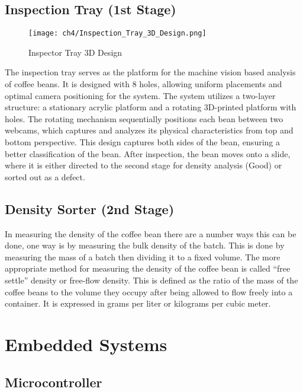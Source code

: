 \subsection{Inspection Tray (1st Stage)}

\begin{figure}[h]
    \centering
    \texttt{[image: ch4/Inspection\_Tray\_3D\_Design.png]} %
    \caption{Inspector Tray 3D Design}
    \label{fig:inspection_tray}
\end{figure}

The inspection tray serves as the platform for the machine vision based analysis of coffee beans. It is designed with 8 holes, allowing uniform placements and optimal camera positioning for the system. The system utilizes a two-layer structure: a stationary acrylic platform and a rotating 3D-printed platform with holes. The rotating mechanism sequentially positions each bean between two webcams, which captures and analyzes its physical characteristics from top and bottom perspective. This design captures both sides of the bean, ensuring a better classification of the bean. After inspection, the bean moves onto a slide, where it is either directed to the second stage for density analysis (Good) or sorted out as a defect.

\subsection{Density Sorter (2nd Stage)}

In measuring the density of the coffee bean there are a number ways this can be done, one way is by measuring the bulk density of the batch. This is done by measuring the mass of a batch then dividing it to a fixed volume. The more appropriate method for measuring the density of the coffee bean is called “free settle” density or free-flow density. This is defined as the ratio of the mass of the coffee beans to the volume they occupy after being allowed to flow freely into a container. It is expressed in grams per liter or kilograms per cubic meter. 

\section{Embedded Systems}

\subsection{Microcontroller}

